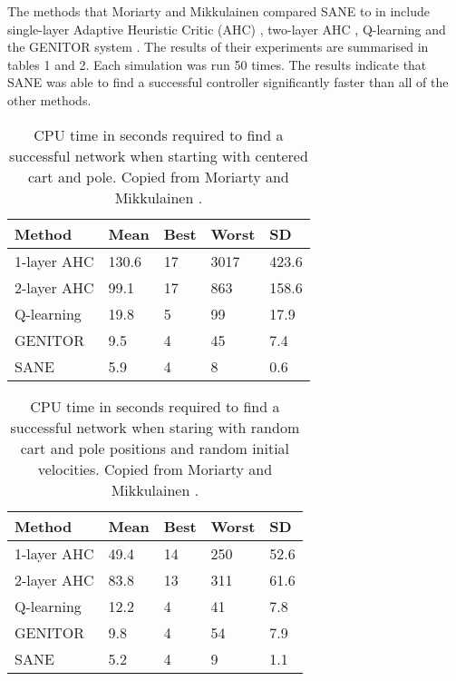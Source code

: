 \documentclass[12pt]{article} %
\begin{document}
The methods that Moriarty and Mikkulainen compared SANE to in \cite{Moriarty1996} include single-layer Adaptive Heuristic Critic (AHC) \cite{Barto1983}, two-layer AHC \cite{Anderson1987}, Q-learning \cite{Watkins1992} and the GENITOR system \cite{Whitley1994}. The results of their experiments are summarised in tables 1 and 2. Each simulation was run 50 times. The results indicate that SANE was able to find a successful controller significantly faster than all of the other methods.

\begin{table} \centering
    \begin{tabular}{|l|l|l|l|l|}
    \hline
    Method      & Mean  & Best & Worst & SD    \\ \hline
    1-layer AHC & 130.6 & 17   & 3017  & 423.6 \\ \hline
    2-layer AHC & 99.1  & 17   & 863   & 158.6 \\ \hline
    Q-learning  & 19.8  & 5    & 99    & 17.9  \\ \hline
    GENITOR     & 9.5   & 4    & 45    & 7.4   \\ \hline
    SANE        & 5.9   & 4    & 8     & 0.6   \\ \hline
    \end{tabular}
    \caption {CPU time in seconds required to find a successful network when starting with centered cart and pole. Copied from Moriarty and Mikkulainen \cite{Moriarty1996}.}
\end{table}

\begin{table} \centering
    \begin{tabular}{|l|l|l|l|l|}
    \hline
    Method      & Mean & Best & Worst & SD   \\ \hline
    1-layer AHC & 49.4 & 14   & 250   & 52.6 \\ \hline
    2-layer AHC & 83.8 & 13   & 311   & 61.6 \\ \hline
    Q-learning  & 12.2 & 4    & 41    & 7.8  \\ \hline
    GENITOR     & 9.8  & 4    & 54    & 7.9  \\ \hline
    SANE        & 5.2  & 4    & 9     & 1.1  \\ \hline
    \end{tabular}
    \caption {CPU time in seconds required to find a successful network when staring with random cart and pole positions and random initial velocities. Copied from Moriarty and Mikkulainen \cite{Moriarty1996}.}
\end{table}
\end{document}

